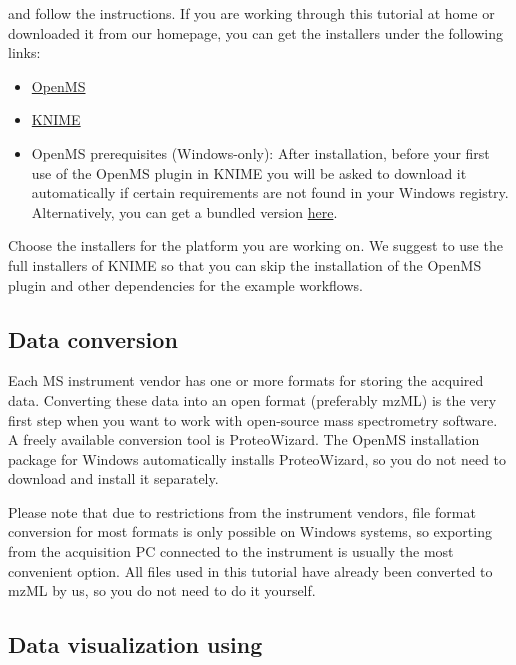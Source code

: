 and follow the instructions. If you are working through this tutorial at home or downloaded it from our homepage, you can get the installers under the
following links:
\begin{itemize}
\item \href{http://www.openms.de/downloads}{OpenMS}
\item \href{https://www.knime.org/downloads/overview}{KNIME}
\item OpenMS prerequisites (Windows-only): After installation, before your first use of the OpenMS plugin in KNIME you will be asked to download it automatically if certain requirements are not found in your Windows registry. Alternatively, you can get a bundled version \href{\WindowsPrerequisitesLink}{here}.
\end{itemize}
Choose the installers for the platform you are working on. We suggest to use the full installers of KNIME so that you can skip the installation of the OpenMS plugin and other dependencies for the example workflows.

\subsection{Data conversion}
\label{Data_Conversion}

Each MS instrument vendor has one or more formats for storing the acquired data. Converting these data into an open format (preferably mzML) is the very first step when you want to work with open-source mass spectrometry software. A freely available conversion tool is ProteoWizard. The OpenMS installation package for Windows automatically installs ProteoWizard, so you do not need to download and install it separately.

Please note that due to restrictions from the instrument vendors, file format conversion for most formats is only possible on Windows systems, so exporting from the acquisition PC connected to the instrument is usually the most convenient option.
All files used in this tutorial have already been converted to mzML by us, so you do not need to do it yourself.


\subsection{Data visualization using }
\label{Data_Visualization}

